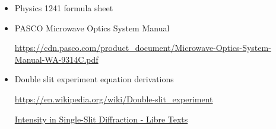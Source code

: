 \begin{itemize}

\item Physics 1241 formula sheet


\item PASCO Microwave Optics System Manual

\url{https://cdn.pasco.com/product_document/Microwave-Optics-System-Manual-WA-9314C.pdf}

\item Double slit experiment equation derivations 

\url{https://en.wikipedia.org/wiki/Double-slit_experiment}

\href{https://batch.libretexts.org/print/url=https://phys.libretexts.org/Bookshelves/University_Physics/University_Physics_(OpenStax)/University_Physics_III_-_Optics_and_Modern_Physics_(OpenStax)/04%3A_Diffraction/4.03%3A_Intensity_in_Single-Slit_Diffraction.pdf}{Intensity in Single-Slit Diffraction - Libre Texts}

\end{itemize}
